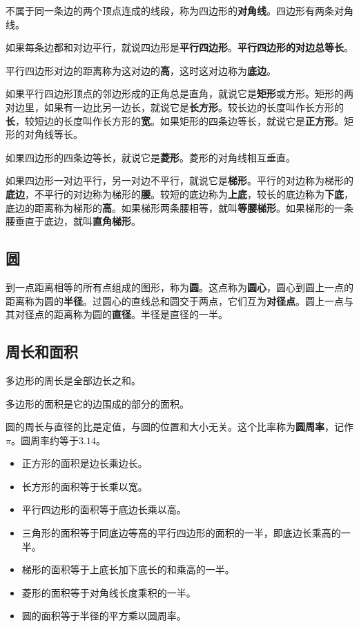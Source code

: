 \documentclass[12pt,UTF8]{ctexart}
\begin{document}
不属于同一条边的两个顶点连成的线段，称为四边形的\textbf{对角线}。四边形有两条对角线。

如果每条边都和对边平行，就说四边形是\textbf{平行四边形}。\textbf{平行四边形的对边总等长}。

平行四边形对边的距离称为这对边的\textbf{高}，这时这对边称为\textbf{底边}。

如果平行四边形顶点的邻边形成的正角总是直角，就说它是\textbf{矩形}或方形。矩形的两对边里，如果有一边比另一边长，就说它是\textbf{长方形}。较长边的长度叫作长方形的\textbf{长}，较短边的长度叫作长方形的\textbf{宽}。如果矩形的四条边等长，就说它是\textbf{正方形}。矩形的对角线等长。

如果四边形的四条边等长，就说它是\textbf{菱形}。菱形的对角线相互垂直。

如果四边形一对边平行，另一对边不平行，就说它是\textbf{梯形}。平行的对边称为梯形的\textbf{底边}，不平行的对边称为梯形的\textbf{腰}。较短的底边称为\textbf{上底}，较长的底边称为\textbf{下底}，底边的距离称为梯形的\textbf{高}。如果梯形两条腰相等，就叫\textbf{等腰梯形}。如果梯形的一条腰垂直于底边，就叫\textbf{直角梯形}。

\subsection{圆}

到一点距离相等的所有点组成的图形，称为\textbf{圆}。这点称为\textbf{圆心}，圆心到圆上一点的距离称为圆的\textbf{半径}。过圆心的直线总和圆交于两点，它们互为\textbf{对径点}。圆上一点与其对径点的距离称为圆的\textbf{直径}。半径是直径的一半。

\subsection{周长和面积}

多边形的周长是全部边长之和。

多边形的面积是它的边围成的部分的面积。

圆的周长与直径的比是定值，与圆的位置和大小无关。这个比率称为\textbf{圆周率}，记作$\pi$。圆周率约等于$3.14$。

\begin{itemize}
    \item 正方形的面积是边长乘边长。
    \item 长方形的面积等于长乘以宽。
    \item 平行四边形的面积等于底边长乘以高。
    \item 三角形的面积等于同底边等高的平行四边形的面积的一半，即底边长乘高的一半。
    \item 梯形的面积等于上底长加下底长的和乘高的一半。
    \item 菱形的面积等于对角线长度乘积的一半。
    \item 圆的面积等于半径的平方乘以圆周率。
\end{itemize}
\end{document}
